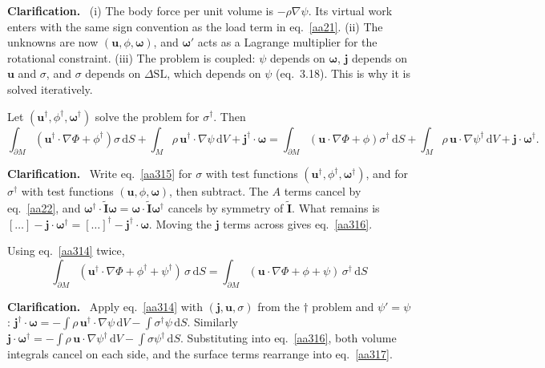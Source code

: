 \documentclass[11pt,a4paper]{article}
\newcommand{\bw}{\bm{\omega}}
\newcommand{\bu}{\mathbf{u}}
\newcommand{\bj}{\mathbf{j}}
\newcommand{\It}{\tilde{\mathbf{I}}}
\newcommand{\dSL}{\Delta\mathrm{SL}}
\newcommand{\dd}{\,\mathrm{d}}
\newcommand{\pM}{\partial M}
\renewenvironment{leftbar}{%
  \def\FrameCommand{{\color{clarbar}\vrule width 2.5pt}\hspace{8pt}}%
  \MakeFramed{\advance\hsize-\width\FrameRestore}}%
  {\endMakeFramed}
\newenvironment{clar}{\begin{leftbar}\small\noindent\textbf{Clarification.}\ }{\end{leftbar}}
\begin{document}
\begin{clar}
(i) The body force per unit volume is $-\rho\nabla\psi$. Its virtual work enters with the same
sign convention as the load term in eq.~\eqref{aa21}. (ii) The unknowns are now
$(\bu,\phi,\bw)$, and $\bw'$ acts as a Lagrange multiplier for the rotational constraint. (iii) The
problem is coupled: $\psi$ depends on $\bw$, $\bj$ depends on $\bu$ and $\sigma$, and $\sigma$
depends on $\dSL$, which depends on $\psi$ (eq.~3.18). This is why it is solved iteratively.
\end{clar}

Let $(\bu^\dagger,\phi^\dagger,\bw^\dagger)$ solve the problem for $\sigma^\dagger$. Then
\begin{equation}
  \int_{\pM}(\bu^\dagger\cdot\nabla\Phi+\phi^\dagger)\sigma\dd S+\int_M\rho\,\bu^\dagger\cdot\nabla\psi\dd V+\bj^\dagger\cdot\bw
  =\int_{\pM}(\bu\cdot\nabla\Phi+\phi)\sigma^\dagger\dd S+\int_M\rho\,\bu\cdot\nabla\psi^\dagger\dd V+\bj\cdot\bw^\dagger .
  \tag{3.16}\label{aa316}
\end{equation}

\begin{clar}
Write eq.~\eqref{aa315} for $\sigma$ with test functions $(\bu^\dagger,\phi^\dagger,\bw^\dagger)$,
and for $\sigma^\dagger$ with test functions $(\bu,\phi,\bw)$, then subtract. The $A$ terms cancel
by eq.~\eqref{aa22}, and $\bw^\dagger\cdot\It\bw=\bw\cdot\It\bw^\dagger$ cancels by symmetry of
$\It$. What remains is
$[\ldots]-\bj\cdot\bw^\dagger=[\ldots]^\dagger-\bj^\dagger\cdot\bw$. Moving the $\bj$ terms across
gives eq.~\eqref{aa316}.
\end{clar}

Using eq.~\eqref{aa314} twice,
\begin{equation}
  \boxed{\;\int_{\pM}(\bu^\dagger\cdot\nabla\Phi+\phi^\dagger+\psi^\dagger)\,\sigma\dd S=
  \int_{\pM}(\bu\cdot\nabla\Phi+\phi+\psi)\,\sigma^\dagger\dd S\;}
  \tag{3.17}\label{aa317}
\end{equation}

\begin{clar}
Apply eq.~\eqref{aa314} with $(\bj,\bu,\sigma)$ from the $\dagger$ problem and $\psi'=\psi$:
$\bj^\dagger\cdot\bw=-\int\rho\,\bu^\dagger\cdot\nabla\psi\dd V-\int\sigma^\dagger\psi\dd S$.
Similarly
$\bj\cdot\bw^\dagger=-\int\rho\,\bu\cdot\nabla\psi^\dagger\dd V-\int\sigma\psi^\dagger\dd S$.
Substituting into eq.~\eqref{aa316}, both volume integrals cancel on each side, and the surface
terms rearrange into eq.~\eqref{aa317}.
\end{clar}
\end{document}
